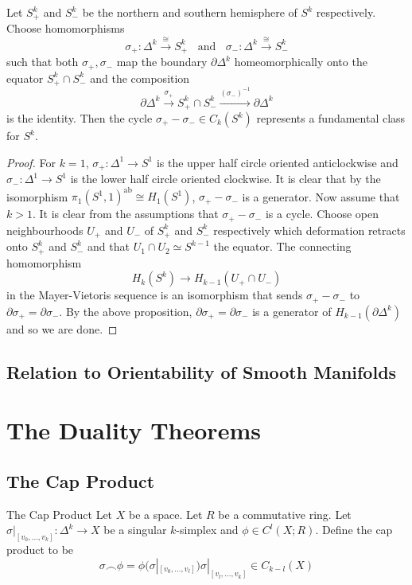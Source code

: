 \documentclass[a4paper]{article}
\begin{document}
\begin{crl}{}{} Let $S_+^k$ and $S_-^k$ be the northern and southern hemisphere of $S^k$ respectively. Choose homomorphisms $$\sigma_+:\Delta^k\overset{\cong}{\longrightarrow} S_+^k\;\;\text{ and }\;\;\sigma_-:\Delta^k\overset{\cong}{\longrightarrow} S_-^k$$ such that both $\sigma_+,\sigma_-$ map the boundary $\partial\Delta^k$ homeomorphically onto the equator $S_+^k\cap S_-^k$ and the composition $$\partial\Delta^k\overset{\sigma_+}{\longrightarrow}S_+^k\cap S_-^k\overset{(\sigma_-)^{-1}}{\longrightarrow}\partial\Delta^k$$ is the identity. Then the cycle $\sigma_+-\sigma_-\in C_k(S^k)$ represents a fundamental class for $S^k$. \tcbline
\begin{proof}
For $k=1$, $\sigma_+:\Delta^1\to S^1$ is the upper half circle oriented anticlockwise and $\sigma_-:\Delta^1\to S^1$ is the lower half circle oriented clockwise. It is clear that by the isomorphism $\pi_1(S^1,1)^\text{ab}\cong H_1(S^1)$, $\sigma_+-\sigma_-$ is a generator. Now assume that $k>1$. It is clear from the assumptions that $\sigma_+-\sigma_-$ is a cycle. Choose open neighbourhoods $U_+$ and $U_-$ of $S_+^k$ and $S_-^k$ respectively which deformation retracts onto $S_+^k$ and $S_-^k$ and that $U_1\cap U_2\simeq S^{k-1}$ the equator. The connecting homomorphism $$H_k(S^k)\to H_{k-1}(U_+\cap U_-)$$ in the Mayer-Vietoris sequence is an isomorphism that sends $\sigma_+-\sigma_-$ to $\partial\sigma_+=\partial\sigma_-$. By the above proposition, $\partial\sigma_+=\partial\sigma_-$ is a generator of $H_{k-1}(\partial\Delta^k)$ and so we are done. 
\end{proof}
\end{crl}


\subsection{Relation to Orientability of Smooth Manifolds}

\pagebreak
\section{The Duality Theorems}
\subsection{The Cap Product}
\begin{defn}{The Cap Product}{} Let $X$ be a space. Let $R$ be a commutative ring. Let $\sigma|_{[v_0,\dots,v_k]}:\Delta^k\to X$ be a singular $k$-simplex and $\phi\in C^l(X;R)$. Define the cap product to be $$\sigma\frown\phi=\phi(\sigma|_{[v_0,\dots,v_l]})\sigma|_{[v_l,\dots,v_k]}\in C_{k-l}(X)$$
\end{defn}
\end{document}
